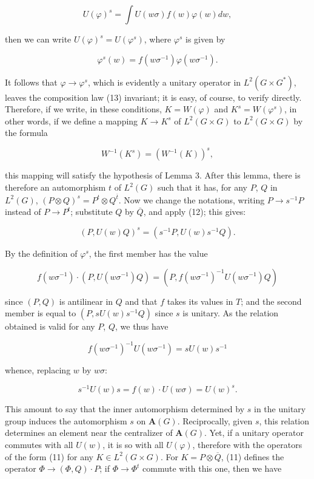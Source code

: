 \documentclass[12pt]{amsart}
\begin{document}
\[
U(\varphi)^{s}=\int U(w\sigma)f(w)\varphi(w)dw,\]


then we can write $U(\varphi)^{s}=U(\varphi^{s})$, where $\varphi^{s}$
is given by

\[
\varphi^{s}(w)=f(w\sigma^{-1})\varphi(w\sigma^{-1}).\]


It follows that $\varphi\rightarrow\varphi^{s}$, which is evidently
a unitary operator in $L^{2}(G\times G^{*})$, leaves the composition
law (13) invariant; it is easy, of course, to verify directly. Therefore,
if we write, in these conditions, $K=W(\varphi)$ and $K^{s}=W(\varphi^{s})$,
in other words, if we define a mapping $K\rightarrow K^{s}$ of $L^{2}(G\times G)$
to $L^{2}(G\times G)$ by the formula

\[
W^{-1}(K^{s})=(W^{-1}(K))^{s},\]


this mapping will satisfy the hypothesis of Lemma 3. After this lemma,
there is therefore an automorphism $t$ of $L^{2}(G)$ such that it
has, for any $P$, $Q$ in $L^{2}(G)$, $(P\otimes Q)^{s}=P^{t}\otimes Q^{\overline{t}}$.
Now we change the notations, writing $P\rightarrow s^{-1}P$ instead
of $P\rightarrow P^{t}$; substitute $Q$ by $\overline{Q}$, and
apply (12); this gives:

\[
(P,U(w)Q)^{s}=(s^{-1}P,U(w)s^{-1}Q).\]


By the definition of $\varphi^{s}$, the first member has the value

\[
f(w\sigma^{-1})\cdot(P,U(w\sigma^{-1})Q)=(P,f(w\sigma^{-1})^{-1}U(w\sigma^{-1})Q)\]


since $(P,Q)$ is antilinear in $Q$ and that $f$ takes its values
in $T$; and the second member is equal to $(P,sU(w)s^{-1}Q)$ since
$s$ is unitary. As the relation obtained is valid for any $P$, $Q$,
we thus have

\[
f(w\sigma^{-1})^{-1}U(w\sigma^{-1})=sU(w)s^{-1}\]


whence, replacing $w$ by $w\sigma$:

\begin{equation}\label{eq:15}
s^{-1}U(w)s=f(w)\cdot U(w\sigma)=U(w)^{s}.
\end{equation}

This amount to say that the inner automorphism determined by $s$
in the unitary group induces the automorphism $s$ on $\mathbf{A}(G)$.
Reciprocally, given $s$, this relation determines an element near
the centralizer of $\mathbf{A}(G)$. Yet, if a unitary operator commutes
with all $U(w)$, it is so with all $U(\varphi)$, therefore with
the operators of the form (11) for any $K\in L^{2}(G\times G)$. For
$K=P\otimes\overline{Q}$, (11) defines the operator $\Phi\rightarrow(\Phi,Q)\cdot P$;
if $\Phi\rightarrow\Phi^{t}$ commute with this one, then we have
\end{document}
